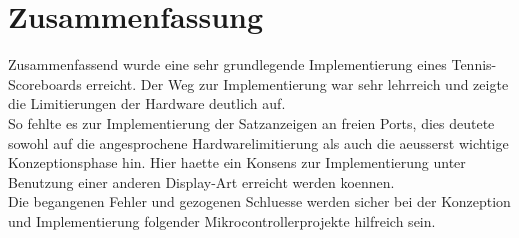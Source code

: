 \chapter{Zusammenfassung}
Zusammenfassend wurde eine sehr grundlegende Implementierung eines Tennis-Scoreboards erreicht. Der Weg zur Implementierung war sehr lehrreich und zeigte die Limitierungen der Hardware deutlich auf.\\
So fehlte es zur Implementierung der Satzanzeigen an freien Ports, dies deutete sowohl auf die angesprochene Hardwarelimitierung als auch die aeusserst wichtige Konzeptionsphase hin. Hier haette ein Konsens zur Implementierung unter Benutzung einer anderen Display-Art erreicht werden koennen.\\
Die begangenen Fehler und gezogenen Schluesse werden sicher bei der Konzeption und Implementierung folgender Mikrocontrollerprojekte hilfreich sein.